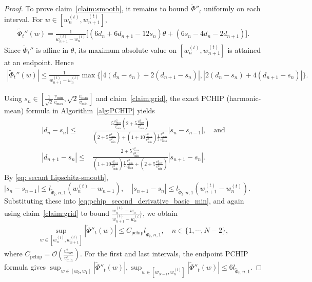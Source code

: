\documentclass{article}
\newcommand{\Oc}{\mathcal{O}}
\newcommand{\Farc}{\Phi}
\begin{document}
\begin{proof}
To prove claim~\ref{claim:smooth}, it remains to bound $\tilde \Farc''_t$ uniformly on each interval.
For $w\in[w_n^{(t)},w_{n+1}^{(t)}]$,
\begin{align}
\tilde \Farc_t''(w)
= 
\frac{1}{w_{n+1}^{(t)}-w_n^{(t)}}
\Big[
(6d_n+6d_{n+1}-12s_n)\theta
+
(6s_n-4d_n-2d_{n+1})
\Big].
\end{align}
Since $\tilde \Farc_t''$ is affine in $\theta$, its maximum absolute value on $[w_n^{(t)},w_{n+1}^{(t)}]$
is attained at an endpoint. Hence
\begin{align}
|\tilde \Farc_t''(w)|
\leq \frac{1}{w_{n+1}^{(t)}-w_n^{(t)}}
\max\Big\{|4(d_n-s_n)+2(d_{n+1}-s_n)|, |2(d_n-s_n)+4(d_{n+1}-s_n)|\Big\}.
\label{eq:pchip_second_derivative_basic_min}
\end{align}

Using $s_n\in\left[\frac{1}{\sqrt2}\frac{v_{\min}}{v_{\max}},\sqrt2\frac{v_{\max}}{v_{\min}}\right]$ and
claim~\ref{claim:grid}, 
the exact PCHIP (harmonic-mean) formula in Algorithm~\ref{alg:PCHIP} yields
\begin{align}
|d_n-s_n|
\le &
\frac{5\frac{v_{\max}^2}{v_{\min}^2}\left(2+5\frac{v_{\max}^2}{v_{\min}^2}\right)}
{\left(2+5\frac{v_{\max}^2}{v_{\min}^2}\right)+\left(1+10\frac{v_{\max}^2}{v_{\min}^2}\right)\frac12\frac{v_{\min}^2}{v_{\max}^2}}
 |s_n-s_{n-1}|,\quad \text{and}\\
|d_{n+1}-s_n|
\le &
\frac{2+5\frac{v_{\max}^2}{v_{\min}^2}}
{\left(1+10\frac{v_{\max}^2}{v_{\min}^2}\right)\frac12\frac{v_{\min}^2}{v_{\max}^2}
+\left(2+5\frac{v_{\max}^2}{v_{\min}^2}\right)}
 |s_{n+1}-s_n|.
\end{align}
By \eqref{eq: secant Lipschitz-smooth},
$
|s_n-s_{n-1}|\le l_{\tilde \Farc_t,n,1}(w_n^{(t)}-w_{n-1}),
\quad
|s_{n+1}-s_n|\le l_{\tilde \Farc_t,n,1}(w_{n+1}^{(t)}-w_n^{(t)}).
$
Substituting these into \eqref{eq:pchip_second_derivative_basic_min}, and again using
claim~\ref{claim:grid} to bound $\frac{w_n^{(t)}-w_{n-1}}{w_{n+1}^{(t)}-w_n^{(t)}}$,
we obtain
\begin{align}
\sup_{w\in[w_n^{(t)},w_{n+1}^{(t)}]}|\tilde \Farc''_t(w)|
\le
C_{\mathrm{pchip}} l_{\tilde \Farc_t,n,1},
\quad n\in\{1,\cdots,N-2\},
\end{align}
where $C_{\mathrm{pchip}} = \Oc\left(\frac{v_{\max}^2}{v_{\min}^2}\right)$.
For the first and last intervals, the endpoint PCHIP formula gives
$
\sup_{w\in[w_0,w_1]}|\tilde \Farc''_t(w)|, 
\sup_{w\in[w_{N-1},w_n^{(t)}]}|\tilde \Farc''_t(w)|
\le
6 l_{\tilde \Farc_t,n,1}.
$


\end{proof}
\end{document}
